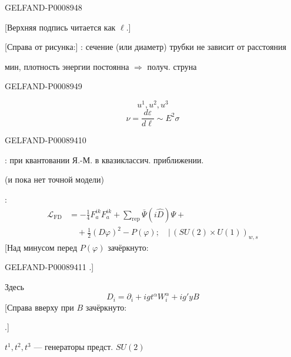 \begin{GelfandAdjacentEvidence}{GELFAND-P000894}{8}

[Верхняя подпись читается как $\ell$.]

[Справа от рисунка:] : сечение (или диаметр) трубки не зависит от расстояния

мин, плотность энергии постоянна $\Rightarrow$ получ. струна
\end{GelfandAdjacentEvidence}
\begin{GelfandAdjacentEvidence}{GELFAND-P000894}{9}

\[
u^1,u^2,u^3
\]
\[
\nu=\frac{d\varepsilon}{d\ell}\sim E^2\sigma
\]
\end{GelfandAdjacentEvidence}
\begin{GelfandAdjacentEvidence}{GELFAND-P000894}{10}


: при квантовании Я.-М. в квазиклассич. приближении.

(и пока нет точной модели)

:
\begin{equation*}
\begin{aligned}
\mathcal L_{\mathrm{FD}}&=-\frac14 F_a^{ik}F_a^{ik}
   +\sum_{\mathrm{rep}}\bar\Psi(i\hat D)\Psi+{}\\
&\quad+\frac12(D\varphi)^2-P(\varphi)\mathpunct{;}\quad
   \big|\,(SU(2)\times U(1))_{w,s}
\end{aligned}
\tag{4}
\end{equation*}
[Над минусом перед $P(\varphi)$ зачёркнуто: 
\end{GelfandAdjacentEvidence}
\begin{GelfandAdjacentEvidence}{GELFAND-P000894}{11}
.]

Здесь
\begin{equation*}
D_i=\partial_i+ig t^\alpha W_i^\alpha+ig'yB \tag{5}
\end{equation*}
[Справа вверху при $B$ зачёркнуто: 
\end{GelfandAdjacentEvidence}
.]

$t^1,t^2,t^3$ — генераторы предст. $SU(2)$


